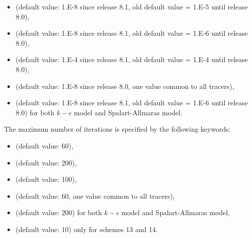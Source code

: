 \begin{itemize}
\item {} (default value: 1.E-8
  since release 8.1, old default value = 1.E-5 until release 8.0),

\item {} (default value: 1.E-8
  since release 8.1, old default value = 1.E-6 until release 8.0),

\item {} (default value: 1.E-4
  since release 8.1, old default value = 1.E-4 until release 8.0),

%
\item {} (default value: 1.E-8
since release 8.0, one value common to all tracers),

\item {} (default value: 1.E-8
  since release 8.1, old default value = 1.E-6 until release 8.0)
for both $k-\epsilon$ model and Spalart-Allmaras model.
\end{itemize}

The maximum number of iterations is specified by the following keywords:

\begin{itemize}
\item {}
(default value: 60),

\item {} (default value:
200),

\item {} (default value: 100),

%
\item {} (default
value: 60, one value common to all tracers),

\item {} (default
value: 200) for both $k-\epsilon$ model and Spalart-Allmaras model,

\item {} (default
value: 10) only for schemes 13 and 14.
\end{itemize}

